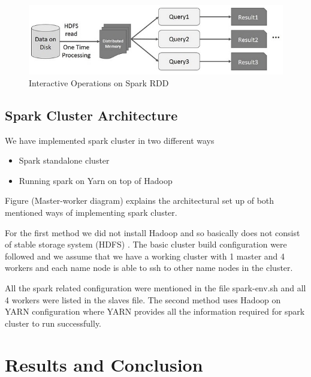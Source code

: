 \begin{figure}[!ht]
  \centering\includegraphics[width=\columnwidth]{images/interactiveSpark.png}
   \caption{Interactive Operations on Spark RDD
   ~\cite{hid-sp18-410-spark-RDD}}\label{fig:interactive-spark}
\end{figure}



\subsection{Spark Cluster Architecture}

We have implemented spark cluster in two different ways

\begin{itemize}

\item Spark standalone cluster
\item Running spark on Yarn on top of Hadoop

\end{itemize}

Figure (Master-worker diagram) explains the architectural set up of both 
mentioned ways of implementing spark cluster.

For the first method we did not install Hadoop and so basically does not consist
 of stable storage system (HDFS) . The basic cluster build configuration were 
 followed and we assume that we have a working cluster with 1 master and 4 
 workers and each name node is able to ssh to other name nodes in the cluster. 

All the spark related configuration were mentioned in the file spark-env.sh and 
all 4 workers were listed in the slaves file.
The second method uses Hadoop on YARN configuration where YARN provides all the 
information required for spark cluster to run successfully.






\section{Results and Conclusion}

